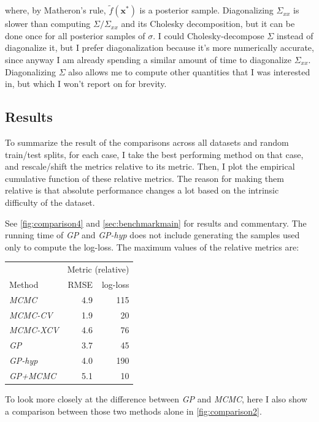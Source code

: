\documentclass[a4paper]{article}
\theoremstyle{definition}
\begin{document}
    where, by Matheron's rule, $\tilde f(\mathbf x^*)$ is a posterior sample. Diagonalizing $\Sigma_{xx}$ is slower than computing $\Sigma/\Sigma_{xx}$ and its Cholesky decomposition, but it can be done once for all posterior samples of $\sigma$. I could Cholesky-decompose $\Sigma$ instead of diagonalize it, but I prefer diagonalization because it's more numerically accurate, since anyway I am already spending a similar amount of time to diagonalize $\Sigma_{xx}$. Diagonalizing $\Sigma$ also allows me to compute other quantities that I was interested in, but which I won't report on for brevity.

    \subsection{Results}

    To summarize the result of the comparisons across all datasets and random train/test splits, for each case, I take the best performing method on that case, and rescale/shift the metrics relative to its metric. Then, I plot the empirical cumulative function of these relative metrics. The reason for making them relative is that absolute performance changes a lot based on the intrinsic difficulty of the dataset.

    See \autoref{fig:comparison4} and \autoref{sec:benchmarkmain} for results and commentary. The running time of \emph{GP} and \emph{GP-hyp} does not include generating the samples used only to compute the log-loss. The maximum values of the relative metrics are:
    \begin{center}
        \begin{tabular}{lrr}
            \toprule
            & \multicolumn{2}{c}{Metric (relative)} \\
            \cline{2-3}
            Method & RMSE & log-loss \\
            \midrule
            \emph{MCMC} & 4.9 & 115 \\
            \emph{MCMC-CV} & 1.9 & 20 \\
            \emph{MCMC-XCV} & 4.6 & 76 \\
            \emph{GP} & 3.7 & 45 \\
            \emph{GP-hyp} & 4.0 & 190 \\
            \emph{GP+MCMC} & 5.1 & 10 \\
            \bottomrule
        \end{tabular}
    \end{center}
    To look more closely at the difference between \emph{GP} and \emph{MCMC}, here I also show a comparison between those two methods alone in \autoref{fig:comparison2}.
\end{document}
